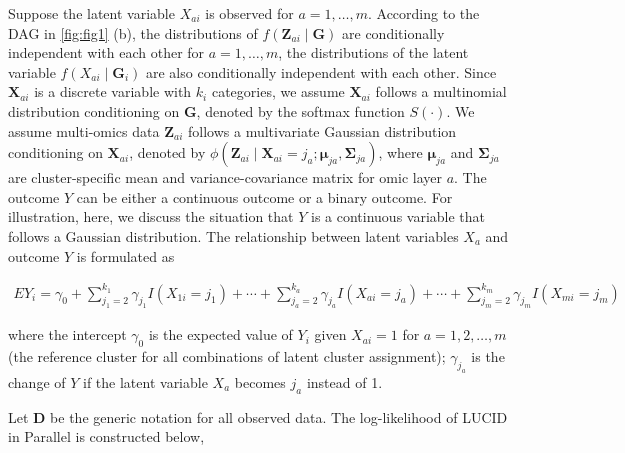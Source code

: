 Suppose the latent variable \(X_{a i}\) is observed for \(a=1, \ldots, m\).
According to the DAG in \ref{fig:fig1} (b), the distributions of
\(f\left(\boldsymbol{Z}_{a i} \mid \boldsymbol{G}\right)\) are
conditionally independent with each other for \(a=1, \ldots, m\), the
distributions of the latent variable
\(f\left(X_{a i} \mid \boldsymbol{G}_{i}\right)\) are also conditionally
independent with each other. Since \(\boldsymbol{X}_{a i}\) is a discrete
variable with \(k_{i}\) categories, we assume \(\boldsymbol{X}_{a i}\)
follows a multinomial distribution conditioning on \(\boldsymbol{G}\),
denoted by the softmax function \(S(\cdot)\). We assume multi-omics data
\(\boldsymbol{Z}_{a i}\) follows a multivariate Gaussian distribution
conditioning on \(\boldsymbol{X}_{a i}\), denoted by
\(\phi\left(\boldsymbol{Z}_{a i} \mid \boldsymbol{X}_{a i}=j_{a} ; \boldsymbol{\mu}_{j a}, \boldsymbol{\Sigma}_{j a}\right)\),
where \(\boldsymbol{\mu}_{j a}\) and \(\boldsymbol{\Sigma}_{j a}\) are
cluster-specific mean and variance-covariance matrix for omic layer \(a\).
The outcome \(Y\) can be either a continuous outcome or a binary outcome.
For illustration, here, we discuss the situation that \(Y\) is a
continuous variable that follows a Gaussian distribution. The
relationship between latent variables \(X_{a}\) and outcome \(Y\) is
formulated as

\[\begin{aligned}
E Y_{i}=\gamma_{0}+\sum_{j_{1}=2}^{k_{1}} \gamma_{j_{1}} I\left(X_{1 i}=j_{1}\right)+\cdots+\sum_{j_{a}=2}^{k_{a}} \gamma_{j_{a}} I\left(X_{a i}=j_{a}\right)+\cdots+\sum_{j_{m}=2}^{k_{m}} \gamma_{j_{m}} I\left(X_{m i}=j_{m}\right)
\end{aligned}
    \label{eq_24}   \label{eq:eq-24}\]

where the intercept \(\gamma_{0}\) is the expected value of \(Y_{i}\) given
\(X_{a i}=1\) for \(a=1,2, \ldots, m\) (the reference cluster for all
combinations of latent cluster assignment); \(\gamma_{j_{a}}\) is the
change of \(Y\) if the latent variable \(X_{a}\) becomes \(j_{a}\) instead of
1.

Let \(\boldsymbol{D}\) be the generic notation for all observed data. The
log-likelihood of LUCID in Parallel is constructed below,

